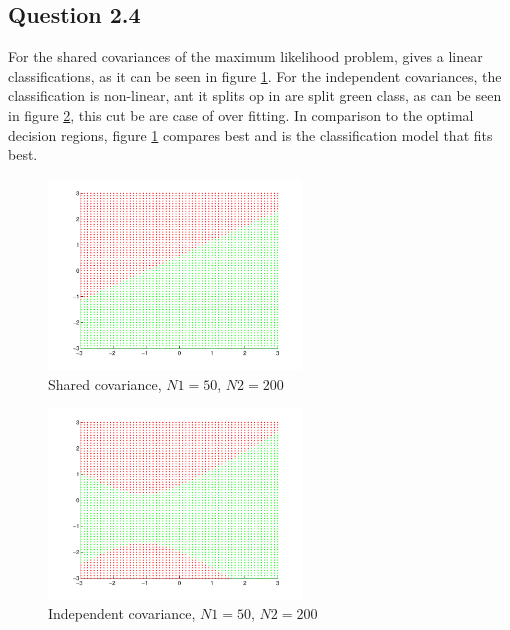 \subsection*{Question 2.4}

For the shared covariances of the maximum likelihood problem, gives a
linear classifications, as it can be seen in
figure \ref{fig:q24a}. For the independent covariances, the
classification is non-linear, ant it splits op in are split green
class, as can be seen in figure
\ref{fig:q24b}, this cut be are case of over fitting. In comparison to
the optimal decision regions, figure \ref{fig:q24a} compares best and is
the classification model that fits best.

\begin{figure}[!htbp]
  \centering
  \includegraphics[width=0.6\textwidth]{./images/q24a.pdf}
  \caption{Shared covariance, $N1 = 50$, $N2= 200$}
  \label{fig:q24a}
\end{figure}

\begin{figure}[!htbp]
  \centering
  \includegraphics[width=0.6\textwidth]{./images/q24b.pdf}
  \caption{Independent covariance, $N1 = 50$, $N2= 200$}
  \label{fig:q24b}
\end{figure}
